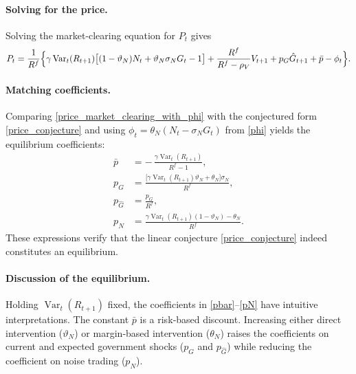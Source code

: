 \documentclass[12pt]{article}
\begin{document}
\paragraph{Solving for the price.}
Solving the market‑clearing equation for \(P_t\) gives
\begin{align}
    P_t = \frac{1}{R^f}
          \Bigl\{
              \gamma \operatorname{Var}_t(R_{t+1})
                  \bigl[ (1-\vartheta_N) N_t + \vartheta_N \sigma_N G_t - 1 \bigr]
              + \frac{R^f}{R^f - \rho_V} V_{t+1}
              + p_G \hat{G}_{t+1}
              + \bar{p}
              - \phi_t
          \Bigr\}. \label{price_market_clearing_with_phi}
\end{align}

\paragraph{Matching coefficients.}
Comparing \eqref{price_market_clearing_with_phi} with the conjectured form \eqref{price_conjecture} and using \(\phi_t = \theta_N (N_t - \sigma_N G_t)\) from \eqref{phi} yields the equilibrium coefficients:
\begin{align}
    \bar{p} &= -\,\frac{\gamma \operatorname{Var}_t(R_{t+1})}{R^f - 1}, \label{pbar}\\[4pt]
    p_G     &= \frac{\bigl[\gamma \operatorname{Var}_t(R_{t+1}) \vartheta_N + \theta_N\bigr] \sigma_N}{R^f}, \label{pG}\\[4pt]
    p_{\hat{G}} &= \frac{p_G}{R^f}, \label{pGhat}\\[4pt]
    p_N     &= \frac{\gamma \operatorname{Var}_t(R_{t+1}) (1-\vartheta_N) - \theta_N}{R^f}. \label{pN}
\end{align}
These expressions verify that the linear conjecture \eqref{price_conjecture} indeed constitutes an equilibrium.


\paragraph{Discussion of the equilibrium.}

Holding \(\operatorname{Var}_t(R_{t+1})\) fixed, the coefficients in \eqref{pbar}--\eqref{pN} have intuitive interpretations.  
The constant \(\bar{p}\) is a risk‑based discount.  
Increasing either direct intervention (\(\vartheta_N\)) or margin‑based intervention (\(\theta_N\)) raises the coefficients on current and expected government shocks (\(p_G\) and \(p_{\hat{G}}\)) while reducing the coefficient on noise trading (\(p_N\)).  
\end{document}
